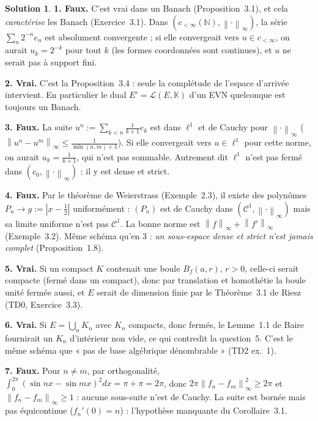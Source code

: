 \documentclass[11pt,a4paper]{article}
\newcommand{\N}{\mathbb{N}}
\newcommand{\K}{\mathbb{K}}
\newcommand{\Bf}{B_f}
\newcommand{\norm}[1]{\left\|#1\right\|}
\newcommand{\Lc}{\mathcal{L}}
\theoremstyle{definition}
\newtheorem*{solution}{Solution}
\begin{document}
\begin{solution}
\noindent\textbf{1. Faux.} C'est vrai dans un Banach (Proposition~3.1), et cela \emph{caractérise} les Banach (Exercice~3.1). Dans $(c_{<\infty}(\N),\norm\cdot_\infty)$, la série $\sum_n2^{-n}e_n$ est absolument convergente ; si elle convergeait vers $u\in c_{<\infty}$, on aurait $u_k=2^{-k}$ pour tout $k$ (les formes coordonnées sont continues), et $u$ ne serait pas à support fini.

\medskip
\noindent\textbf{2. Vrai.} C'est la Proposition~3.4 : seule la complétude de l'espace d'arrivée intervient. En particulier le dual $E'=\Lc(E,\K)$ d'un EVN quelconque est toujours un Banach.

\medskip
\noindent\textbf{3. Faux.} La suite $u^n:=\sum_{k<n}\frac1{k+1}e_k$ est dans $\ell^1$ et de Cauchy pour $\norm\cdot_\infty$ ($\norm{u^n-u^m}_\infty\le\frac1{\min(n,m)+1}$). Si elle convergeait vers $u\in\ell^1$ pour cette norme, on aurait $u_k=\frac1{k+1}$, qui n'est pas sommable. Autrement dit $\ell^1$ n'est pas fermé dans $(c_0,\norm\cdot_\infty)$ : il y est dense et strict.

\medskip
\noindent\textbf{4. Faux.} Par le théorème de Weierstrass (Exemple~2.3), il existe des polynômes $P_n\to g:=|x-\frac12|$ uniformément : $(P_n)$ est de Cauchy dans $(\mathcal C^1,\norm\cdot_\infty)$ mais sa limite uniforme n'est pas $\mathcal C^1$. La bonne norme est $\norm f_\infty+\norm{f'}_\infty$ (Exemple~3.2). Même schéma qu'en 3 : \emph{un sous-espace dense et strict n'est jamais complet} (Proposition~1.8).

\medskip
\noindent\textbf{5. Vrai.} Si un compact $K$ contenait une boule $\Bf(a,r)$, $r>0$, celle-ci serait compacte (fermé dans un compact), donc par translation et homothétie la boule unité fermée aussi, et $E$ serait de dimension finie par le Théorème~3.1 de Riesz (TD0, Exercice~3.3).

\medskip
\noindent\textbf{6. Vrai.} Si $E=\bigcup_nK_n$ avec $K_n$ compacts, donc fermés, le Lemme~1.1 de Baire fournirait un $K_n$ d'intérieur non vide, ce qui contredit la question~5. C'est le même schéma que « pas de base algébrique dénombrable » (TD2 ex.~1).

\medskip
\noindent\textbf{7. Faux.} Pour $n\ne m$, par orthogonalité, $\int_0^{2\pi}(\sin nx-\sin mx)^2dx=\pi+\pi=2\pi$, donc $2\pi\norm{f_n-f_m}_\infty^2\ge2\pi$ et $\norm{f_n-f_m}_\infty\ge1$ : aucune sous-suite n'est de Cauchy. La suite est bornée mais pas équicontinue ($f_n'(0)=n$) : l'hypothèse manquante du Corollaire~3.1.


\end{solution}
\end{document}

